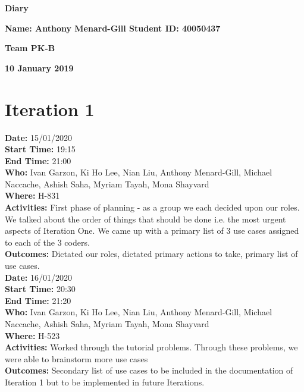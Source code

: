 \documentclass[12pt]{article}
\begin{document}
\vspace*{0.2in}
\centerline{\bf\Large Diary}

\vspace*{0.2in}
\centerline{\bf\Large Name: Anthony Menard-Gill   Student ID: 40050437}

\vspace*{0.2in}
\centerline{\bf\Large Team PK-B}

\vspace*{0.2in}
\centerline{\bf\Large 10 January 2019}

\section{Iteration 1}

{\bf Date:} 15/01/2020\\
{\bf Start Time:} 19:15\\
{\bf End Time:} 21:00 \\
{\bf Who:} Ivan Garzon, Ki Ho Lee, Nian Liu, Anthony Menard-Gill, Michael Naccache, Ashish Saha, Myriam Tayah, Mona Shayvard\\
{\bf Where:} H-831 \\
{\bf Activities:} First phase of planning - as a group we each decided upon our roles. We talked about the order of things that should be done i.e. the most urgent aspects of Iteration One. We came up with a primary list of 3 use cases assigned to each of the 3 coders.\\
{\bf Outcomes:} Dictated our roles, dictated primary actions to take, primary list of use cases.\\

{\bf Date:} 16/01/2020\\
{\bf Start Time:} 20:30\\
{\bf End Time:} 21:20 \\
{\bf Who:} Ivan Garzon, Ki Ho Lee, Nian Liu, Anthony Menard-Gill, Michael Naccache, Ashish Saha, Myriam Tayah, Mona Shayvard\\
{\bf Where:} H-523 \\
{\bf Activities:}  Worked through the tutorial problems. Through these problems, we were able to brainstorm more use cases\\
{\bf Outcomes:} Secondary list of use cases to be included in the documentation of Iteration 1 but to be implemented in future Iterations.\\
\end{document}
